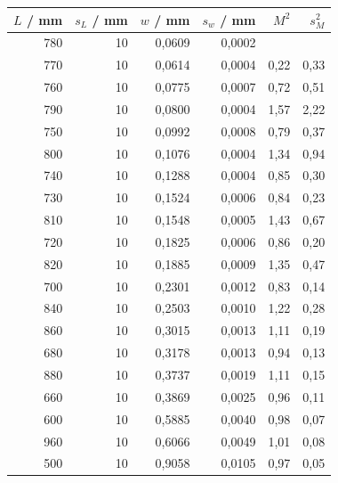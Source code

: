 \begin{table}
    \centering
    \begin{tabular}{rrrrrr}
        \toprule
        $L$ / mm&  $s_L$ / mm &      $w$ / mm&    $s_w$ / mm&         $M^2$ &        $s_M^2$ \\
        \midrule
        780 &  10 &  0,0609 &  0,0002 &       &       \\
        770 &  10 &  0,0614 &  0,0004 &  0,22 &  0,33 \\
        760 &  10 &  0,0775 &  0,0007 &  0,72 &  0,51 \\
        790 &  10 &  0,0800 &  0,0004 &  1,57 &  2,22 \\
        750 &  10 &  0,0992 &  0,0008 &  0,79 &  0,37 \\
        800 &  10 &  0,1076 &  0,0004 &  1,34 &  0,94 \\
        740 &  10 &  0,1288 &  0,0004 &  0,85 &  0,30 \\
        730 &  10 &  0,1524 &  0,0006 &  0,84 &  0,23 \\
        810 &  10 &  0,1548 &  0,0005 &  1,43 &  0,67 \\
        720 &  10 &  0,1825 &  0,0006 &  0,86 &  0,20 \\
        820 &  10 &  0,1885 &  0,0009 &  1,35 &  0,47 \\
        700 &  10 &  0,2301 &  0,0012 &  0,83 &  0,14 \\
        840 &  10 &  0,2503 &  0,0010 &  1,22 &  0,28 \\
        860 &  10 &  0,3015 &  0,0013 &  1,11 &  0,19 \\
        680 &  10 &  0,3178 &  0,0013 &  0,94 &  0,13 \\
        880 &  10 &  0,3737 &  0,0019 &  1,11 &  0,15 \\
        660 &  10 &  0,3869 &  0,0025 &  0,96 &  0,11 \\
        600 &  10 &  0,5885 &  0,0040 &  0,98 &  0,07 \\
        960 &  10 &  0,6066 &  0,0049 &  1,01 &  0,08 \\
        500 &  10 &  0,9058 &  0,0105 &  0,97 &  0,05 \\
        \bottomrule
    \end{tabular}
    \label{tab:M1}
\end{table}

